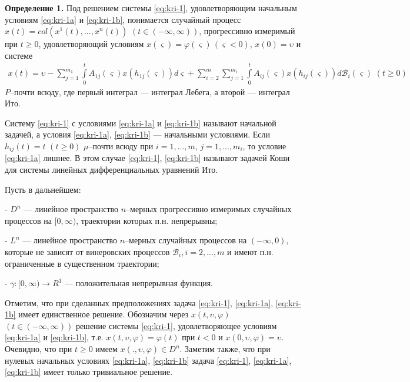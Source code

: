 \textbf {Определение 1.}  Под решением системы \eqref{eq:kri-1}, удовлетворяющим
начальным условиям \eqref{eq:kri-1a} и \eqref{eq:kri-1b}, понимается случайный процесс $x(t) =
col (x^1(t), ..., x^n(t))$ $ (t \in (-\infty , \infty))$,
прогрессивно измеримый при  $t \ge 0$, удовлетворяющий условиям
$x(\varsigma)=\varphi (\varsigma) {\,} (\varsigma < 0)$, $x(0) =
\upsilon$ и системе
$$
\begin {array}{crl}
 x(t) =   \upsilon - \sum \limits_{j=1}^{m_1}\int \limits _0^t A_{1j}(\varsigma)x(h_{1j}(\varsigma))d\varsigma
 + \sum \limits_{i=2}^m\sum
\limits_{j=1}^{m_i}\int \limits
 _0^t A_{ij}(\varsigma)x(h_{ij}(\varsigma))d\mathcal B_i(\varsigma)
 \,\, (t \ge 0)
\end {array}
$$
$P$--почти всюду, где первый интеграл --- интеграл Лебега, а второй
--- интеграл Ито.

Систему \eqref{eq:kri-1} с условиями \eqref{eq:kri-1a} и \eqref{eq:kri-1b} называют начальной задачей, а
условия \eqref{eq:kri-1a}, \eqref{eq:kri-1b} --- начальными условиями. Если $h_{ij}(t) = t$
$(t \geq 0)$  $\mu $--почти всюду при $i = 1,...,m$, $j =
1,...,m_i$, то условие \eqref{eq:kri-1a} лишнее. В этом случае \eqref{eq:kri-1}, \eqref{eq:kri-1b} называют
задачей Коши для системы линейных дифференциальных уравнений Ито.

Пусть в дальнейшем:

- $D^n$ --- линейное пространство $n$--мерных прогрессивно измеримых
случайных процессов на $[0, \infty )$, траектории которых п.н.
непрерывны;

- $L^n$ --- линейное пространство $n$--мерных случайных процессов на
$(-\infty , 0)$, которые не зависят от винеровских процессов
$\mathcal B_i, i = 2, ..., m$ и имеют п.н. ограниченные в
существенном траектории;

- $\gamma :[0, \infty) \rightarrow R^1 $
--- положительная непрерывная функция.

Отметим, что при сделанных предположениях задача \eqref{eq:kri-1}, \eqref{eq:kri-1a}, \eqref{eq:kri-1b}
имеет единственное решение. Обозначим через $x(t, \upsilon,
\varphi)$ $(t \in (-\infty , \infty ))$ решение системы \eqref{eq:kri-1},
удовлетворяющее условиям \eqref{eq:kri-1a} и \eqref{eq:kri-1b}, т.е. $x(t, \upsilon, \varphi )
= \varphi (t)$ при $t < 0$ и $x(0, \upsilon, \varphi ) = \upsilon$.
Очевидно, что при $t \ge 0$ имеем $x(., \upsilon, \varphi) \in D^n$.
Заметим также, что при нулевых начальных условиях \eqref{eq:kri-1a}, \eqref{eq:kri-1b} задача
\eqref{eq:kri-1}, \eqref{eq:kri-1a}, \eqref{eq:kri-1b} имеет только тривиальное решение.

